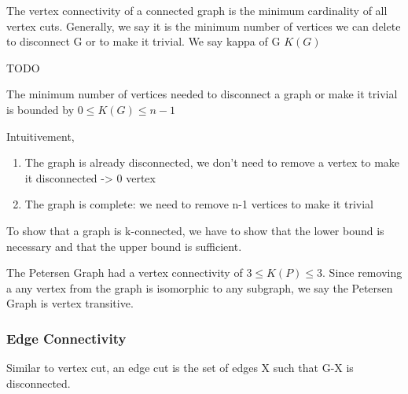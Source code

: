\documentclass{article}
\begin{document}
\begin{definition}
    The vertex connectivity of a connected graph is the minimum cardinality of
    all vertex cuts. Generally, we say it is the minimum number of vertices we
    can delete to disconnect G or to make it trivial. We say kappa of G $K(G)$
\end{definition}

\begin{definition}
    TODO
\end{definition}

\begin{theorem}
    The minimum number of vertices needed to disconnect a graph or make it
    trivial is bounded by $ 0 \leq K(G) \leq n-1$
\end{theorem}

\begin{intuition}
    Intuitivement,
    \begin{enumerate}
        \item The graph is already disconnected, we don't need to remove a
	    vertex to make it disconnected -> 0 vertex
	\item The graph is complete: we need to remove n-1 vertices to make
	    it trivial
    \end{enumerate}
\end{intuition}

\begin{remark}
    To show that a graph is k-connected, we have to show that the lower bound
    is necessary and that the upper bound is sufficient.
\end{remark}

\begin{proposition}
    The Petersen Graph had a vertex connectivity of $3 \leq K(P) \leq 3$.
    Since removing a any vertex from the graph is isomorphic to any subgraph,
    we say the Petersen Graph is vertex transitive.
\end{proposition}

\subsubsection{Edge Connectivity}

\begin{definition}
    Similar to vertex cut, an edge cut is the set of edges X such that G-X is
    disconnected.
\end{definition}
\end{document}
